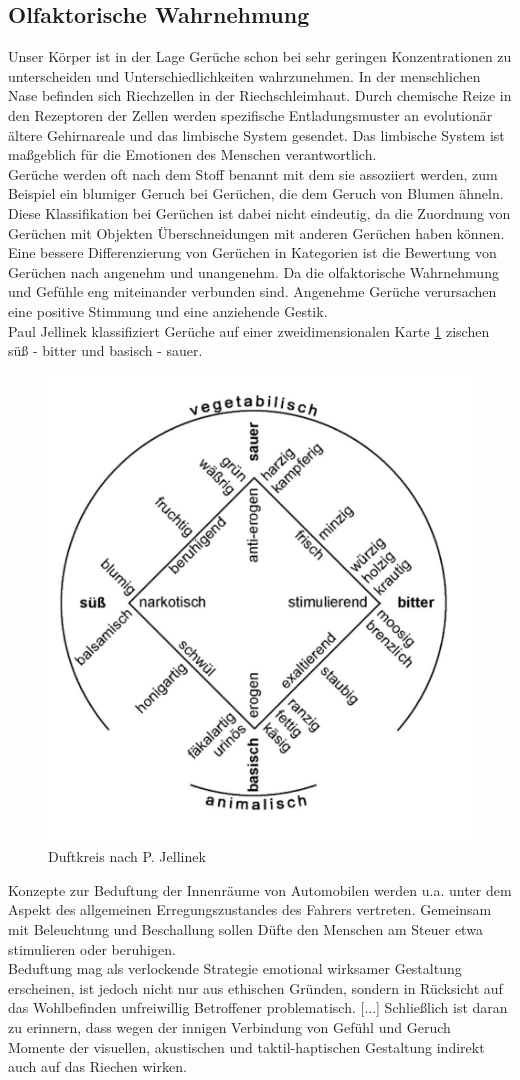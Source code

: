 \subsection{Olfaktorische Wahrnehmung}
Unser Körper ist in der Lage Gerüche schon bei sehr geringen Konzentrationen zu unterscheiden und Unterschiedlichkeiten wahrzunehmen. In der menschlichen Nase befinden sich Riechzellen in der Riechschleimhaut. Durch chemische Reize in den Rezeptoren der Zellen werden spezifische Entladungsmuster an evolutionär ältere Gehirnareale und das limbische System gesendet. Das limbische System ist maßgeblich für die Emotionen des Menschen verantwortlich. \cite[Vgl. Seite 102]{Schonhammer.2013}\\
Gerüche werden oft nach dem Stoff benannt mit dem sie assoziiert werden, zum Beispiel ein blumiger Geruch bei Gerüchen, die dem Geruch von Blumen ähneln. Diese Klassifikation bei Gerüchen ist dabei nicht eindeutig, da die Zuordnung von Gerüchen mit Objekten Überschneidungen mit anderen Gerüchen haben können. Eine bessere Differenzierung von Gerüchen in Kategorien ist die Bewertung von Gerüchen nach angenehm und unangenehm. Da die olfaktorische Wahrnehmung und Gefühle eng miteinander verbunden sind. Angenehme Gerüche verursachen eine positive Stimmung und eine anziehende Gestik. \cite[Vgl. Seite 105 f.]{Schonhammer.2013}\\
Paul Jellinek klassifiziert Gerüche auf einer zweidimensionalen Karte \ref{fig:Duft} zischen süß - bitter und basisch - sauer. \cite[Vgl. Seite 104]{Schonhammer.2013}
\begin{figure}[hbt]
	\centering
	\includegraphics[width=0.5\linewidth]{images/Duft}
	\caption[Duftkreis nach P. Jellinek]{Duftkreis nach P. Jellinek \cite[Seite 105]{Schonhammer.2013}}
	\label{fig:Duft}
\end{figure}
\glqq Konzepte zur Beduftung der Innenräume von Automobilen werden u.a. unter dem Aspekt des allgemeinen Erregungszustandes des Fahrers vertreten. Gemeinsam mit Beleuchtung und Beschallung sollen Düfte den Menschen am Steuer etwa stimulieren oder beruhigen.\grqq{} \cite[Seite 122 f.]{Schonhammer.2013}\\
\glqq Beduftung mag als verlockende Strategie emotional wirksamer Gestaltung erscheinen, ist jedoch nicht nur aus ethischen Gründen, sondern in Rücksicht auf das Wohlbefinden unfreiwillig Betroffener problematisch. [...] Schließlich ist daran zu erinnern, dass wegen der innigen Verbindung von Gefühl und Geruch Momente der visuellen, akustischen und taktil-haptischen Gestaltung indirekt auch auf das Riechen wirken. \grqq{} \cite[Seite 123]{Schonhammer.2013}
